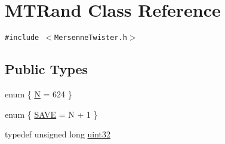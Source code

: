 \hypertarget{classMTRand}{
\section{MTRand Class Reference}
\label{classMTRand}
}
{\tt \#include $<$MersenneTwister.h$>$}

\subsection*{Public Types}
\begin{CompactItemize}
\item 
enum \{ \hyperlink{classMTRand_b8fea37d16b55e1a0fe06149e325f1b660f472facea8fabd42765cd91273db7b}{N} =  624
 \}
\item 
enum \{ \hyperlink{classMTRand_7d9f4f1783a4e45f7834dd5174dfc2a13899803ea0d4da3018d311ed4902d9cc}{SAVE} =  N + 1
 \}
\item 
typedef unsigned long \hyperlink{classMTRand_45478edf9e24dcd2a5164bac3889d6a2}{uint32}

\end{CompactItemize}
